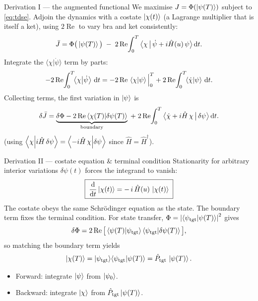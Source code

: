 \documentclass[10pt,aspectratio=169]{beamer}
\newcommand{\Hop}{\hat H}
\renewcommand{\Re}{\operatorname{Re}}
\newcommand{\dt}{\frac{\dd}{\dd t}}
\newcommand{\chit}{\ket{\chi(t)}}
\begin{document}
\begin{frame}{Derivation I --- the augmented functional}
  We maximise $J=\Phi(\ket{\psi(T)})$ subject to \eqref{eq:tdse}.
  Adjoin the dynamics with a costate $\chit$ (a Lagrange multiplier that is
  itself a ket), using $2\Re$ to vary bra and ket consistently:
  \begin{equation}
    \bar J = \Phi\big(\ket{\psi(T)}\big)
      \;-\; 2\Re\!\int_0^T \big\langle \chi \,\big|\, \dot\psi + i\Hop(u)\,\psi\big\rangle\,\dd t .
  \end{equation}
  Integrate the $\langle\chi|\dot\psi\rangle$ term by parts:
  \begin{equation}
    -2\Re\!\int_0^T\!\!\braket{\chi}{\dot\psi}\,\dd t
      = -2\Re\,\braket{\chi}{\psi}\Big|_0^T
        + 2\Re\!\int_0^T\!\!\braket{\dot\chi}{\psi}\,\dd t .
  \end{equation}
  Collecting terms, the first variation in $\ket{\psi}$ is
  \begin{equation}
    \delta\bar J
      = \underbrace{\delta\Phi - 2\Re\braket{\chi(T)}{\delta\psi(T)}}_{\text{boundary}}
      \;+\; 2\Re\!\int_0^T \big\langle \dot\chi + i\Hop\,\chi \,\big|\, \delta\psi\big\rangle\,\dd t .
  \end{equation}
  (using $\braket{\chi}{i\Hop\,\delta\psi}=\braket{-i\Hop\,\chi}{\delta\psi}$ since $\Hop=\Hop^\dagger$).
\end{frame}

\begin{frame}{Derivation II --- costate equation \& terminal condition}
  Stationarity for arbitrary interior variations $\delta\psi(t)$ forces the
  integrand to vanish:
  \begin{equation}
    \boxed{\;\dt\chit = -\,i\,\Hop(u)\,\chit\;}
  \end{equation}
  \alert{The costate obeys the same Schr\"odinger equation as the state.}
  The boundary term fixes the terminal condition. For state transfer,
  $\Phi=\abs{\braket{\psi_{\mathrm{tgt}}}{\psi(T)}}^2$ gives
  \[
    \delta\Phi = 2\Re\big[\braket{\psi(T)}{\psi_{\mathrm{tgt}}}\braket{\psi_{\mathrm{tgt}}}{\delta\psi(T)}\big],
  \]
  so matching the boundary term yields
  \begin{equation}
    \ket{\chi(T)} = \ket{\psi_{\mathrm{tgt}}}\!\braket{\psi_{\mathrm{tgt}}}{\psi(T)}
                  = \hat P_{\mathrm{tgt}}\,\ket{\psi(T)} .
  \end{equation}
  \begin{itemize}
    \item Forward: integrate $\ket\psi$ from $\ket{\psi_0}$.
    \item Backward: integrate $\ket\chi$ from $\hat P_{\mathrm{tgt}}\ket{\psi(T)}$.
  \end{itemize}
\end{frame}
\end{document}
